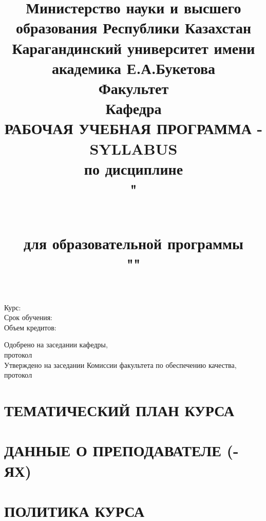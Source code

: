 \title{\fontsize{11}{11}\selectfont Министерство науки и высшего образования
Республики Казахстан \\
\hfill \break
Карагандинский университет имени академика Е.А.Букетова \\
\hfill \break
Факультет \faculty \\
\hfill \break
Кафедра \department \\
\vspace{40mm}
\textbf{РАБОЧАЯ УЧЕБНАЯ ПРОГРАММА - SYLLABUS} \\
\hfill \break
по дисциплине \\
\hfill \break
"\subject" \\

\hfill \break
для образовательной программы \\
\hfill \break
"\group"
}
\maketitle
\vspace{30mm}
\raggedright
Курс: \course \\
Срок обучения: \studyTime \\
Объем кредитов: \credits \\

\vfill

Одобрено на заседании кафедры, \\
протокол \\
\hfill \break
Утверждено на заседании  Комиссии факультета по обеспечению качества, \\
протокол \\

\newpage
\section{\selectfont ТЕМАТИЧЕСКИЙ ПЛАН КУРСА}
\tematicsTable

\section{ДАННЫЕ О ПРЕПОДАВАТЕЛЕ (-ЯХ)}
\justifying
\lecturers

\section{ПОЛИТИКА КУРСА}
\justifying

